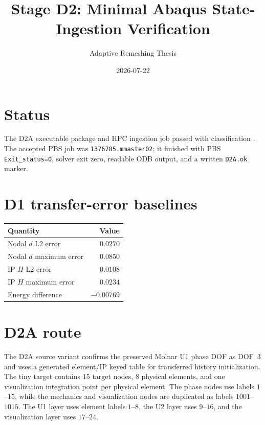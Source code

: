\documentclass[11pt,a4paper]{article}
\title{Stage D2: Minimal Abaqus State-Ingestion Verification}
\author{Adaptive Remeshing Thesis}
\date{2026-07-22}
\begin{document}
\maketitle

\section{Status}
The D2A executable package and HPC ingestion job passed with classification
. The accepted PBS job was
\texttt{1376785.mmaster02}; it finished with PBS \texttt{Exit\_status=0},
solver exit zero, readable ODB output, and a written \texttt{D2A.ok} marker.

\section{D1 transfer-error baselines}
\begin{table}[h]
\centering
\begin{tabular}{@{}lr@{}}
\toprule
Quantity & Value \\
\midrule
Nodal $d$ L2 error & $0.0270$ \\
Nodal $d$ maximum error & $0.0850$ \\
IP $H$ L2 error & $0.0108$ \\
IP $H$ maximum error & $0.0234$ \\
Energy difference & $-0.00769$ \\
\bottomrule
\end{tabular}
\end{table}

\section{D2A route}
The D2A source variant confirms the preserved Molnar U1 phase DOF as DOF~3 and
uses a generated element/IP keyed table for transferred history initialization.
The tiny target contains $15$ target nodes, $8$ physical elements, and one
visualization integration point per physical element. The phase nodes use
labels $1$--$15$, while the mechanics and visualization nodes are duplicated as
labels $1001$--$1015$. The U1 layer uses element labels $1$--$8$, the U2 layer
uses $9$--$16$, and the visualization layer uses $17$--$24$.
\end{document}

